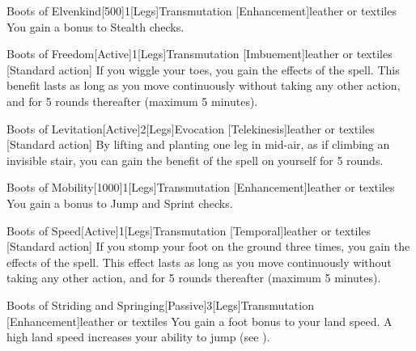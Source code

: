         \begin{magicitemdef}{Boots of Elvenkind}[500]{1}[Legs]{Transmutation [Enhancement]}{leather or textiles}
             You gain a  bonus to Stealth checks.
        \end{magicitemdef}

        \begin{magicitemdef}{Boots of Freedom}[Active]{1}[Legs]{Transmutation [Imbuement]}{leather or textiles}
            [Standard action] If you wiggle your toes, you gain the effects of the  spell.
            This benefit lasts as long as you move continuously without taking any other action, and for 5 rounds thereafter (maximum 5 minutes).
        \end{magicitemdef}

        \begin{magicitemdef}{Boots of Levitation}[Active]{2}[Legs]{Evocation [Telekinesis]}{leather or textiles}
            [Standard action] By lifting and planting one leg in mid-air, as if climbing an invisible stair, you can gain the benefit of the  spell on yourself for 5 rounds.
        \end{magicitemdef}

        \begin{magicitemdef}{Boots of Mobility}[1000]{1}[Legs]{Transmutation [Enhancement]}{leather or textiles}
             You gain a  bonus to Jump and Sprint checks.
        \end{magicitemdef}

        \begin{magicitemdef}{Boots of Speed}[Active]{1}[Legs]{Transmutation [Temporal]}{leather or textiles}
            [Standard action] If you stomp your foot on the ground three times, you gain the effects of the  spell.
            This effect lasts as long as you move continuously without taking any other action, and for 5 rounds thereafter (maximum 5 minutes).
        \end{magicitemdef}

        \begin{magicitemdef}{Boots of Striding and Springing}[Passive]{3}[Legs]{Transmutation [Enhancement]}{leather or textiles}
             You gain a  foot bonus to your land speed.
            A high land speed increases your ability to jump (see ).
        \end{magicitemdef}

